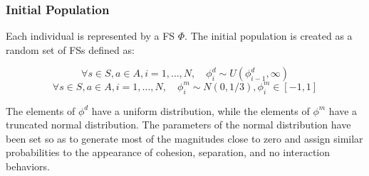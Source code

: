 \documentclass[a4paper]{llncs}
\begin{document}
\subsubsection{Initial Population}
\label{par:GA_Initial}
Each individual is represented by a FS $\Phi$. The initial population is created as a random set of FSs defined as:
\begin{small}
\begin{equation}
	\label{eq:init_dist}
	\forall s \in S, a \in A,  i = 1, \ldots, N, \quad \phi^d_i \sim U(\phi^d_{i-1},\infty)
\end{equation}
\begin{equation}
	\label{eq:init_magn}
	\forall s \in S, a \in A,  i = 1, \ldots, N, \quad \phi^m_i \sim N(0,1/3), \phi^m_i \in [-1,1]
\end{equation}
\end{small}
The elements of $\phi^d$ have a uniform distribution, while the elements of $\phi^m$ have a truncated normal distribution. The parameters of the normal distribution have been set so as to generate most of the magnitudes close to zero and assign similar probabilities to the appearance of cohesion, separation, and no interaction behaviors.
\end{document}
